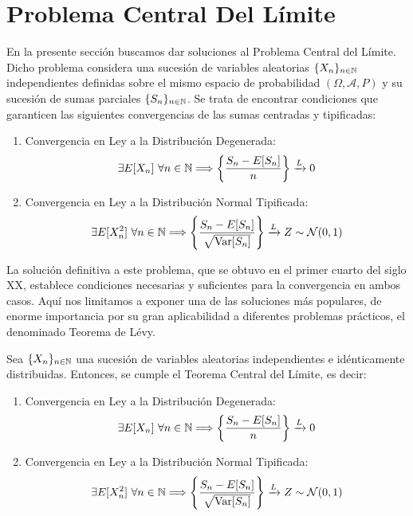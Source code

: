 \section{Problema Central Del Límite}

En la presente sección buscamos dar soluciones al Problema Central del Límite. Dicho problema considera una sucesión de variables aleatorias $\{X_n\}_{n\in \mathbb{N}}$ independientes definidas sobre el mismo espacio de probabilidad $(\Omega, \mathcal{A}, P)$ y su sucesión de sumas parciales $\{S_n\}_{n\in \mathbb{N}}$. Se trata de encontrar condiciones que garanticen las siguientes convergencias de las sumas centradas y tipificadas:
\begin{enumerate}
    \item Convergencia en Ley a la Distribución Degenerada:
    \begin{equation*}
        \exists E[X_n]~\forall n\in \mathbb{N}\Longrightarrow \left\{\frac{S_n - E[S_n]}{n}\right\} \xrightarrow{L} 0
    \end{equation*}
    \item Convergencia en Ley a la Distribución Normal Tipificada:
    \begin{equation*}
        \exists E[X_n^2]~\forall n\in \mathbb{N}\Longrightarrow \left\{\frac{S_n - E[S_n]}{\sqrt{\operatorname{Var}[S_n]}}\right\} \xrightarrow{L} Z\sim \mathcal{N}(0,1)
    \end{equation*}
\end{enumerate}

La solución definitiva a este problema, que se obtuvo en el primer cuarto del siglo XX, establece condiciones necesarias y suficientes para la convergencia en ambos casos. Aquí nos limitamos a exponer una de las soluciones más populares, de enorme importancia por su gran aplicabilidad a diferentes problemas prácticos, el denominado Teorema de Lévy.
\begin{teo}\label{teo:teorema_de_levy}
    Sea $\{X_n\}_{n\in \mathbb{N}}$ una sucesión de variables aleatorias independientes e idénticamente distribuidas. Entonces, se cumple el Teorema Central del Límite, es decir:
    \begin{enumerate}
        \item Convergencia en Ley a la Distribución Degenerada:
        \begin{equation*}
            \exists E[X_n]~\forall n\in \mathbb{N}\Longrightarrow \left\{\frac{S_n - E[S_n]}{n}\right\} \xrightarrow{L} 0
        \end{equation*}
        \item Convergencia en Ley a la Distribución Normal Tipificada:
        \begin{equation*}
            \exists E[X_n^2]~\forall n\in \mathbb{N}\Longrightarrow \left\{\frac{S_n - E[S_n]}{\sqrt{\operatorname{Var}[S_n]}}\right\} \xrightarrow{L} Z\sim \mathcal{N}(0,1)
        \end{equation*}
    \end{enumerate}
\end{teo}

